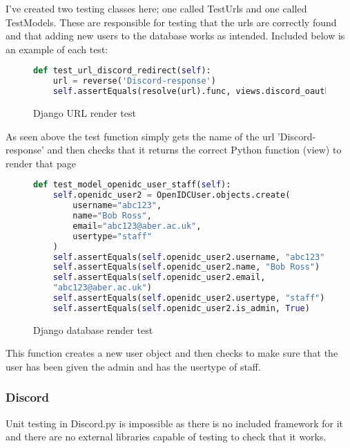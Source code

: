 I've created two testing classes here; one called TestUrls and one called TestModels. These are responsible for testing that the urls are correctly found and that adding new users to the database works as intended. Included below is an example of each test:

\begin{figure}[H]
\begin{lstlisting}[language=Python]
def test_url_discord_redirect(self):
    url = reverse('Discord-response')
    self.assertEquals(resolve(url).func, views.discord_oauth2_redirect)
\end{lstlisting}
\caption{Django URL render test}
\label{fig:django-url}
\end{figure}
As seen above the test function simply gets the name of the url 'Discord-response' and then checks that it returns the correct Python function (view) to render that page

\begin{figure}[H]
\begin{lstlisting}[language=Python]
def test_model_openidc_user_staff(self):
    self.openidc_user2 = OpenIDCUser.objects.create(
        username="abc123",
        name="Bob Ross",
        email="abc123@aber.ac.uk",
        usertype="staff"
    )
    self.assertEquals(self.openidc_user2.username, "abc123")
    self.assertEquals(self.openidc_user2.name, "Bob Ross")
    self.assertEquals(self.openidc_user2.email, 
    "abc123@aber.ac.uk")
    self.assertEquals(self.openidc_user2.usertype, "staff")
    self.assertEquals(self.openidc_user2.is_admin, True)
\end{lstlisting}
\caption{Django database render test}
\label{fig:django-database}
\end{figure}
This function creates a new user object and then checks to make sure that the user has been given the admin and has the usertype of staff.

\subsubsection{Discord}
Unit testing in Discord.py is impossible as there is no included framework for it and there are no external libraries capable of testing to check that it works.

